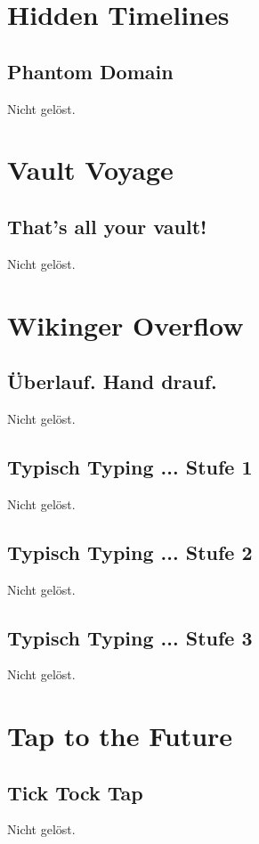 \documentclass[12pt, a4paper, titlepage, oneside]{scrartcl}
\begin{document}
	\section{Hidden Timelines}

	\subsection{Phantom Domain}
	Nicht gelöst.

	\section{Vault Voyage}

	\subsection{That's all your vault!}
	Nicht gelöst.

	\section{Wikinger Overflow}

	\subsection{\"Uberlauf. Hand drauf.}
	Nicht gelöst.

	\subsection{Typisch Typing ... Stufe 1}
	Nicht gelöst.

	\subsection{Typisch Typing ... Stufe 2}
	Nicht gelöst.

	\subsection{Typisch Typing ... Stufe 3}
	Nicht gelöst.

	\section{Tap to the Future}

	\subsection{Tick Tock Tap}
	Nicht gelöst.
\end{document}
